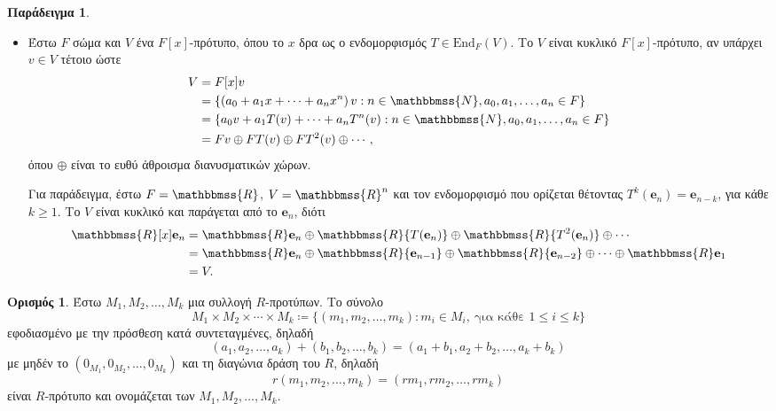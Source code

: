 \documentclass[12pt,a4paper,reqno]{amsart}
\theoremstyle{definition}
\newtheorem{definition}[theorem]{Ορισμός}
\newtheorem{example}[theorem]{Παράδειγμα}
\theoremstyle{remark}
\numberwithin{theorem}{section}
\numberwithin{exercise}{section}
\numberwithin{equation}{section}
\newcommand{\NN}{\mathbbmss{N}}
\newcommand{\RR}{\mathbbmss{R}}
\newcommand{\bfe}{\mathbf{e}}
\newcommand{\End}{\mathrm{End}}
\newcommand{\defn}[1]{{\color{mylightblue}{#1}}}
\begin{document}
\begin{example}
\begin{itemize}
        \item[(στ)] Έστω $F$ σώμα και $V$ ένα $F[x]$-πρότυπο, όπου το $x$ δρα ως ο ενδομορφισμός $T \in \End_F(V)$. Το $V$ είναι κυκλικό $F[x]$-πρότυπο, αν υπάρχει $v \in V$ τέτοιο ώστε 
        \begin{align*}
            V 
            &= F[x]v \\
            &= \{\left(
                a_0 + a_1x + \cdots + a_nx^n
            \right)v : n \in \NN, a_0, a_1, \dots, a_n \in F\} \\
            &= \{a_0v + a_1T(v) + \cdots + a_nT^n(v) : n \in \NN, a_0, a_1, \dots, a_n \in F\} \\
            &= Fv \oplus F{T(v)} \oplus F{T^2(v)} \oplus \cdots,
        \end{align*}
        όπου $\oplus$ είναι το ευθύ άθροισμα διανυσματικών χώρων. 

        Για παράδειγμα, έστω $F = \RR$, $V = \RR^n$ και τον ενδομορφισμό που ορίζεται θέτοντας $T^k(\bfe_n) = \bfe_{n-k}$, για κάθε $k \ge 1$. Το $V$ είναι κυκλικό και παράγεται από το $\bfe_n$, διότι
        \begin{align*}
            \RR[x]\bfe_n 
            &= \RR\bfe_n \oplus \RR{T(\bfe_n)} \oplus \RR{T^2(\bfe_n)} \oplus \cdots \\
            &= \RR\bfe_n \oplus \RR{\bfe_{n-1}} \oplus \RR{\bfe_{n-2}} \oplus \cdots \oplus \RR\bfe_1 \\
            &= V.
        \end{align*}
    \end{itemize}
\end{example}

\begin{definition}
    \label{def:direct_sum}
    Έστω $M_1, M_2, \dots, M_k$ μια συλλογή $R$-προτύπων. Το σύνολο 
    \[
    M_1 \times M_2 \times \cdots \times M_k \coloneqq 
    \{(m_1, m_2, \dots, m_k) : m_i \in M_i, \ \text{για κάθε $1 \le i \le k$}\}
    \] 
    εφοδιασμένο με την πρόσθεση κατά συντεταγμένες, δηλαδή 
    \[
    (a_1, a_2, \dots, a_k) + (b_1, b_2, \dots, b_k) = (a_1 + b_1, a_2+b_2, \dots, a_k + b_k)
    \]
    με μηδέν το $(0_{M_1}, 0_{M_2}, \dots, 0_{M_k})$ και τη διαγώνια δράση του $R$, δηλαδή 
    \[
    r (m_1, m_2, \dots, m_k) = (rm_1, rm_2, \dots, rm_k)
    \]
    είναι $R$-πρότυπο και ονομάζεται \defn{ευθύ γινόμενο} των $M_1, M_2, \dots, M_k$.
\end{definition}
\end{document}
